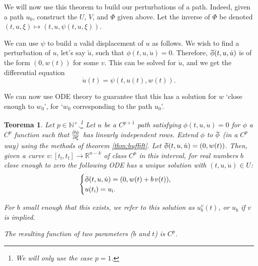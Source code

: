 \documentclass{article}
\theoremstyle{plain}
\newtheorem{theorem}{Teorema}
\theoremstyle{plain}
\theoremstyle{nonumberplain}
\theoremstyle{empty}
\newcommand{\R}{\mathbb{R}}
\newcommand{\N}{\mathbb{N}}
\newcommand{\tstart}{\mathrm{i}}
\newcommand{\tend}{\mathrm{f}}
\newcommand{\wtphi}{
  \mspace{2mu}
  \widetilde{\mspace{-2mu}\smash[t]{\phi}}
}
\begin{document}
We will now use this theorem to build our perturbations of a path. Indeed, given a path $u_0$, construct the $U$, $V$, and $\Phi$ given above. Let the inverse of $\Phi$ be denoted $(t,u,\xi) \mapsto (t,u,\psi(t,u,\xi))$.

We can use $\psi$ to build a valid displacement of $u$ as follows. We wish to find a perturbation of $u$, let's say $\tilde u$, such that $\phi(t,u,\dot u) = 0$. Therefore, $\wtphi(t,u,\dot u)$ is of the form $(0,w(t))$ for some $v$. This can be solved for $\dot u$, and we get the differential equation
\[\dot u(t) = \psi(t,u(t),w(t)).\]

We can now use ODE theory to guarantee that this has a solution for $w$ `close enough to $w_0$', for `$w_0$ corresponding to the path $u_0$'.

\begin{theorem}\label{thm:perturbation}
Let $p \in \N^+$.\footnote{We will only use the case $p = 1$.} Let $u$ be a $C^{p+1}$ path satisfying $\phi(t,u,\dot u) = 0$ for $\phi$ a $C^p$ function such that $\diffp \phi \xi$ has linearly independent rows. Extend $\phi$ to $\wtphi$ (in a $C^p$ way) using the methods of theorem \ref{thm:buffift}. Let $\wtphi(t,u,\dot u) = (0, w(t))$. Then, given a curve $v : [t_\tstart, t_\tend] \to \R^{n-k}$ of class $C^p$ in this interval, for real numbers $b$ close enough to zero the following ODE has a unique solution with $(t,u,\dot u) \in U$:
\[
\begin{cases}
\wtphi(t, u, \dot u) = (0, w(t) + b\,v(t)),\\
u(t_\tstart) = u_\tstart.
\end{cases}
\]

For $b$ small enough that this exists, we refer to this solution as $u_b^v(t)$, or $u_b$ if $v$ is implied.

The resulting function of two parameters ($b$ and $t$) is $C^p$.
\end{theorem}
\end{document}
